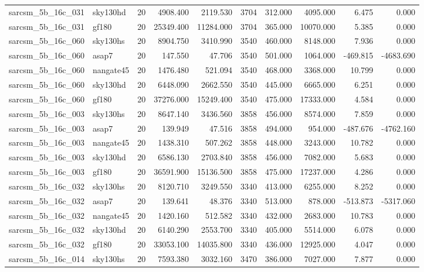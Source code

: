 \begin{tabular}{llrrrrrrrr}
sarcsm\_5b\_16c\_031 & sky130hd & 20 & 4908.400 & 2119.530 & 3704 & 312.000 & 4095.000 & 6.475 & 0.000 \\
sarcsm\_5b\_16c\_031 & gf180 & 20 & 25349.400 & 11284.000 & 3704 & 365.000 & 10070.000 & 5.385 & 0.000 \\
sarcsm\_5b\_16c\_060 & sky130hs & 20 & 8904.750 & 3410.990 & 3540 & 460.000 & 8148.000 & 7.936 & 0.000 \\
sarcsm\_5b\_16c\_060 & asap7 & 20 & 147.550 & 47.706 & 3540 & 501.000 & 1064.000 & -469.815 & -4683.690 \\
sarcsm\_5b\_16c\_060 & nangate45 & 20 & 1476.480 & 521.094 & 3540 & 468.000 & 3368.000 & 10.799 & 0.000 \\
sarcsm\_5b\_16c\_060 & sky130hd & 20 & 6448.090 & 2662.550 & 3540 & 445.000 & 6665.000 & 6.251 & 0.000 \\
sarcsm\_5b\_16c\_060 & gf180 & 20 & 37276.000 & 15249.400 & 3540 & 475.000 & 17333.000 & 4.584 & 0.000 \\
sarcsm\_5b\_16c\_003 & sky130hs & 20 & 8647.140 & 3436.560 & 3858 & 456.000 & 8574.000 & 7.859 & 0.000 \\
sarcsm\_5b\_16c\_003 & asap7 & 20 & 139.949 & 47.516 & 3858 & 494.000 & 954.000 & -487.676 & -4762.160 \\
sarcsm\_5b\_16c\_003 & nangate45 & 20 & 1438.310 & 507.262 & 3858 & 448.000 & 3243.000 & 10.782 & 0.000 \\
sarcsm\_5b\_16c\_003 & sky130hd & 20 & 6586.130 & 2703.840 & 3858 & 456.000 & 7082.000 & 5.683 & 0.000 \\
sarcsm\_5b\_16c\_003 & gf180 & 20 & 36591.900 & 15136.500 & 3858 & 475.000 & 17237.000 & 4.286 & 0.000 \\
sarcsm\_5b\_16c\_032 & sky130hs & 20 & 8120.710 & 3249.550 & 3340 & 413.000 & 6255.000 & 8.252 & 0.000 \\
sarcsm\_5b\_16c\_032 & asap7 & 20 & 139.641 & 48.376 & 3340 & 513.000 & 878.000 & -513.873 & -5317.060 \\
sarcsm\_5b\_16c\_032 & nangate45 & 20 & 1420.160 & 512.582 & 3340 & 432.000 & 2683.000 & 10.783 & 0.000 \\
sarcsm\_5b\_16c\_032 & sky130hd & 20 & 6140.290 & 2553.700 & 3340 & 405.000 & 5514.000 & 6.078 & 0.000 \\
sarcsm\_5b\_16c\_032 & gf180 & 20 & 33053.100 & 14035.800 & 3340 & 436.000 & 12925.000 & 4.047 & 0.000 \\
sarcsm\_5b\_16c\_014 & sky130hs & 20 & 7593.380 & 3032.160 & 3470 & 386.000 & 7027.000 & 7.877 & 0.000 \\

\end{tabular}
